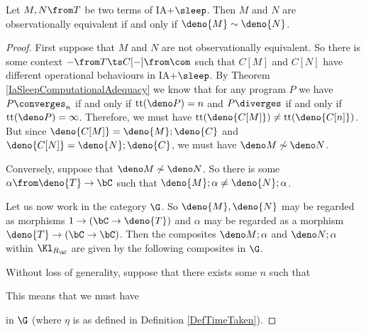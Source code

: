 \begin{theorem}
  Let $M,N\from T$ be two terms of IA+$\sleep$.  
  Then $M$ and $N$ are observationally equivalent if and only if $\deno{M}\sim\deno{N}$.
  \label{IaSleepTimeComplexity}
\end{theorem}
\begin{proof}
  First suppose that $M$ and $N$ are not observationally equivalent.  
  So there is some context $-\from T\ts C[-]\from\com$ such that $C[M]$ and $C[N]$ have different operational behaviours in IA+$\sleep$.
  By Theorem \ref{IaSleepComputationalAdequacy} we know that for any program $P$ we have $P\converges_n$ if and only if $\tit(\deno P)=n$ and $P\diverges$ if and only if $\tit(\deno P)=\infty$.
  Therefore, we must have $\tit(\deno{C[M]})\ne \tit(\deno{C[n]})$.  
  But since $\deno{C[M]}=\deno{M};\deno{C}$ and $\deno{C[N]}=\deno{N};\deno{C}$, we must have $\deno M\not\sim \deno N$.

  Conversely, suppose that $\deno M \not\sim \deno N$.  
  So there is some $\alpha\from \deno{T} \to \bC$ such that $\deno{M};\alpha\ne\deno{N};\alpha$.

  Let us now work in the category $\G$.  
  So $\deno{M},\deno{N}$ may be regarded as morphisms $1 \to (\bC \to \deno{T})$ and $\alpha$ may be regarded as a morphism $\deno{T} \to (\bC \to \bC)$.
  Then the composites $\deno M;\alpha$ and $\deno N;\alpha$ within $\Kl_{R_\bC}$ are given by the following composites in $\G$.
  Without loss of generality, suppose that there exists some $n$ such that
  This means that we must have
  in $\G$ (where $\eta$ is as defined in Definition \ref{DefTimeTaken}).


\end{proof}
